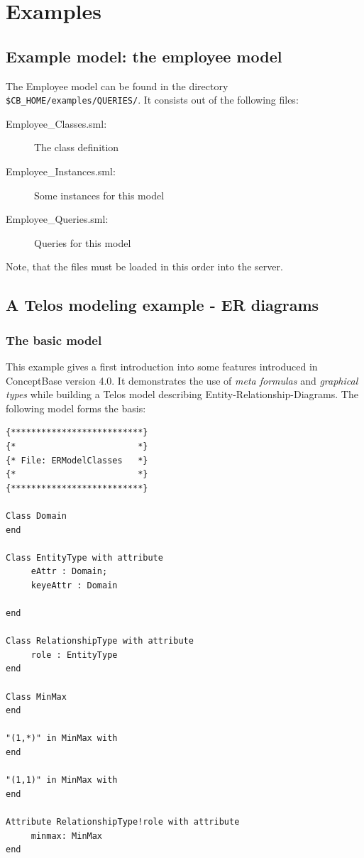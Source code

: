
\chapter{Examples}
\label{cap:examples}

\section{Example model: the employee model}
\label{sec:employee-model}

The Employee model can be found in the directory \verb+$CB_HOME/examples/QUERIES/+.
It consists out of the following files:

\begin{description}
\item[Employee\_Classes.sml:] The class definition
\item[Employee\_Instances.sml:] Some instances for this model
\item[Employee\_Queries.sml:] Queries for this model
\end{description}

Note, that the files must be loaded in this order into the server.

\section{A Telos modeling example - ER diagrams}
\label{sec:ER-diagrams}

\subsection{The basic model}
\label{subsec:ER-basic-model}
This example gives a first introduction into some features introduced in
ConceptBase version 4.0. It demonstrates the use of {\em meta formulas} and
{\em graphical types} while building a Telos model describing
Entity-Relationship-Diagrams. The following model forms the basis:\\

{\small
\begin{verbatim}
{**************************}
{*                        *}
{* File: ERModelClasses   *}
{*                        *}
{**************************}

Class Domain
end

Class EntityType with attribute
     eAttr : Domain;
     keyeAttr : Domain

end

Class RelationshipType with attribute
     role : EntityType
end

Class MinMax
end

"(1,*)" in MinMax with
end

"(1,1)" in MinMax with
end

Attribute RelationshipType!role with attribute
     minmax: MinMax
end
\end{verbatim}
}

